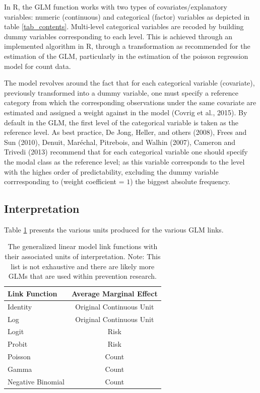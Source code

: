 \documentclass[]{DissertateUSU}
\begin{document}
In R, the GLM function works with two types of covariates/explanatory
variables: numeric (continuous) and categorical (factor) variables as
depicted in table \ref{tab_contents}. Multi-level categorical variables
are recoded by building dummy variables corresponding to each level.
This is achieved through an implemented algorithm in R, through a
transformation as recommended for the estimation of the GLM,
particularly in the estimation of the poisson regression model for count
data.

The model revolves around the fact that for each categorical variable
(covariate), previously transformed into a dummy variable, one must
specify a reference category from which the corresponding observations
under the same covariate are estimated and assigned a weight against in
the model (Covrig et al., 2015). By default in the GLM, the first level
of the categorical variable is taken as the reference level. As best
practice, De Jong, Heller, and others (2008), Frees and Sun (2010),
Denuit, Maréchal, Pitrebois, and Walhin (2007), Cameron and Trivedi
(2013) recommend that for each categorical variable one should specify
the modal class as the reference level; as this variable corresponds to
the level with the highes order of predictability, excluding the dummy
variable corrresponding to (weight coefficient = \(1\)) the biggest
absolute frequency.

\subsection{Interpretation}

Table \ref{tab_int} presents the various units produced for the various
GLM links.

\begin{table}[tb]
\centering
\caption{The generalized linear model link functions with their associated units of interpretation. Note: This list is not exhaustive and there are likely more GLMs that are used within prevention research.} 
\label{tab_int}
\begin{tabular}{lc}
\toprule
Link Function & Average Marginal Effect \\ 
\midrule
Identity & Original Continuous Unit \\ 
  Log & Original Continuous Unit \\ 
  Logit & Risk \\ 
  Probit & Risk \\ 
  Poisson & Count \\ 
  Gamma & Count \\ 
  Negative Binomial & Count \\ 
\bottomrule
\end{tabular}
\end{table}
\end{document}
